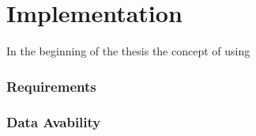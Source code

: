 
\chapter{Implementation}
In the beginning of the thesis the concept of using 



\subsection{Requirements}



\subsection{Data Avability}
